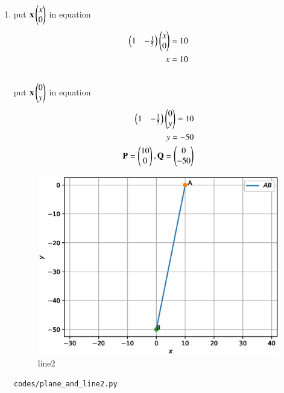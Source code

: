 \begin{enumerate}[label=\arabic*.,ref=\thesubsection.\theenumi]
\begin{enumerate}
\item put $\mathbf x \begin{pmatrix}x\\0\end{pmatrix}$ in equation 
\begin{align}
\begin{pmatrix}1 & -\frac{1}{5}\end{pmatrix}\begin{pmatrix}x\\0\end{pmatrix} = 10
\\
x= 10
\end{align}
\\
put $\mathbf x \begin{pmatrix}0\\y\end{pmatrix}$ in equation
\\
\begin{align}
\begin{pmatrix}1 & -\frac{1}{5}\end{pmatrix}\begin{pmatrix}0\\y\end{pmatrix} = 10
\\
y= -50
\\
\mathbf{P} = \begin{pmatrix}10\\0\end{pmatrix}, \mathbf{Q} = \begin{pmatrix}0\\-50\end{pmatrix}
\end{align}
\begin{figure}[!ht]
	\centering
	\includegraphics[width=\columnwidth]{./figures/plane_and_line2.eps}
	\caption{line2 }
	\label{fig:line2}
\end{figure}
\begin{lstlisting}
codes/plane_and_line2.py
\end{lstlisting}




\end{enumerate}
\end{enumerate}
